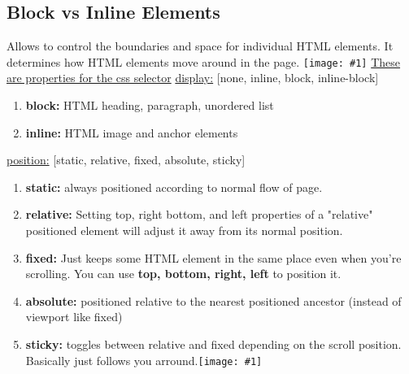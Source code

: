 \documentclass{article}
\def\image#1#2{{\texttt{[image: \#1]}}}
\def\enum#1{\begin{enumerate}#1\end{enumerate}}
\begin{document}
\subsection{Block vs Inline Elements}
Allows to control the boundaries and space for individual HTML elements. It determines how HTML elements move around in the page.
\newline
\image{block-inline.png}{0.4}
\newline
\underline{These are properties for the css selector}\newline \newline
\ul{display:} [none, inline, block, inline-block]
\enum{
\item{\textbf{block:} HTML heading, paragraph, unordered list}
\item{\textbf{inline:} HTML image and anchor elements}
}
\ul{position:} [static, relative, fixed, absolute, sticky]
\enum{
\item{\textbf{static:} always positioned according to normal flow of page.}
\item{\textbf{relative:} Setting top, right bottom, and left properties of a "relative" positioned element will adjust it away from its normal position.\newline \image{relative.png}{0.3}}
\item{\textbf{fixed:} Just keeps some HTML element in the same place even when you're scrolling. You can use \textbf{top, bottom, right, left} to position it.\newline \image{fixed.png}{0.3}}
\item{\textbf{absolute:} positioned relative to the nearest positioned ancestor (instead of viewport like fixed)\newline \image{absolute.png}{0.3}}
\item{\textbf{sticky:} toggles between relative and fixed depending on the scroll position. Basically just follows you arround.\image{sticky.png}{0.3}}
}
\end{document}
